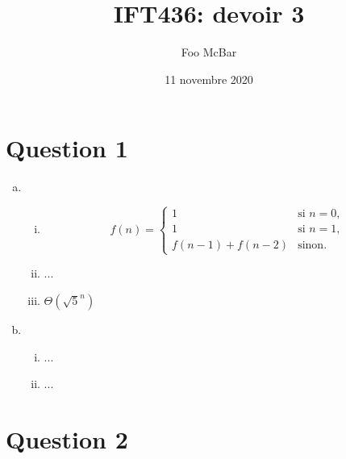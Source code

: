 \documentclass{article}
\title{IFT436: devoir 3}
\author{Foo McBar}
\date{11 novembre 2020}
\begin{document}
\maketitle

\section*{Question 1}

\begin{enumerate}[(a)]
\item \leavevmode
  
  \begin{enumerate}[(i)]

  \item
    
    \[
    f(n) =
    \begin{cases}
      1 & \text{si } n = 0, \\
      
      1 & \text{si } n = 1, \\
      
      f(n-1) + f(n-2) & \text{sinon}.
    \end{cases}
    \]
    
  \item ...
    
  \item $\Theta(\sqrt{5}^n)$

  \end{enumerate}

\item \leavevmode
  
  \begin{enumerate}[(i)]
  \item ...
    
  \item ...
  \end{enumerate}
\end{enumerate}

\section*{Question 2}
\end{document}
